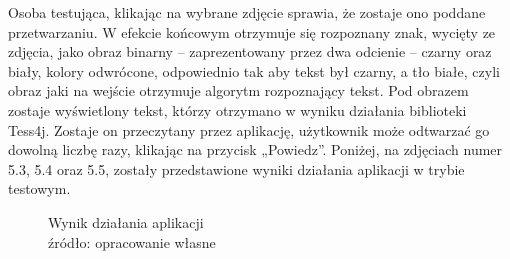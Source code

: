 \documentclass[eng,oneside]{mgr}
\begin{document}
\par Osoba testująca, klikając na wybrane zdjęcie sprawia, że zostaje ono poddane przetwarzaniu. W efekcie końcowym otrzymuje się rozpoznany znak, wycięty ze zdjęcia, jako obraz binarny – zaprezentowany przez dwa odcienie – czarny oraz biały, kolory odwrócone, odpowiednio tak aby tekst był czarny, a tło białe, czyli obraz jaki na wejście otrzymuje algorytm rozpoznający tekst. Pod obrazem zostaje wyświetlony tekst, którzy otrzymano w wyniku działania biblioteki Tess4j. Zostaje on przeczytany przez aplikację, użytkownik może odtwarzać go dowolną liczbę razy, klikając na przycisk „Powiedz”. Poniżej, na zdjęciach numer 5.3, 5.4 oraz 5.5, zostały przedstawione wyniki działania aplikacji w trybie testowym.
\begin{figure}
\centering
{}
\quad
{}
\renewcommand\figurename{Przykład}
\caption{Wynik działania aplikacji
\\ 
źródło: opracowanie własne}
\end{figure}
\end{document}
